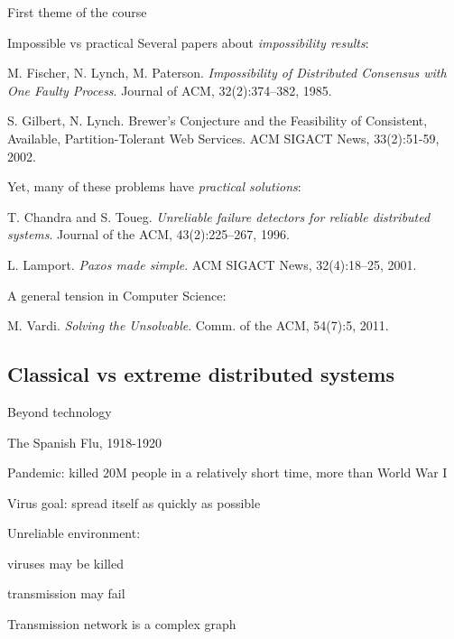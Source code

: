 \begin{frame}{First theme of the course}

\begin{block}{Impossible vs practical}
Several papers about \emph{impossibility results}:
{\footnotesize
\BI
\item M. Fischer, N. Lynch, M. Paterson. \emph{Impossibility of Distributed Consensus with One Faulty Process}. Journal of ACM, 32(2):374--382, 1985.
\item S. Gilbert, N. Lynch. Brewer's Conjecture and the Feasibility of Consistent, Available, Partition-Tolerant Web Services. ACM SIGACT News, 33(2):51-59, 2002.
\EI
}

\bigskip
Yet, many of these problems have \emph{practical solutions}:
{\footnotesize
\BI
\item T. Chandra and S. Toueg. \emph{Unreliable failure detectors for reliable distributed systems}. Journal of the ACM, 43(2):225--267, 1996.
\item L. Lamport. \emph{Paxos made simple}. ACM SIGACT News, 32(4):18--25, 2001.
\EI
}
\end{block}

\bigskip
A general tension in Computer Science:
\BI
\item {\footnotesize M. Vardi. \emph{Solving the Unsolvable}. Comm. of the ACM, 54(7):5, 2011}. 
\EI

\end{frame}

\subsection{Classical vs extreme distributed systems}

\begin{frame}{Beyond technology}
\begin{block}{The Spanish Flu, 1918-1920}
\BI
\item Pandemic: killed 20M people in a relatively short time, more than World War I
\item Virus goal: spread itself as quickly as possible
\item Unreliable environment:
\BI
\item viruses may be killed
\item transmission may fail
\EI
\item Transmission network is a complex graph
\EI
\end{block}

\end{frame}

